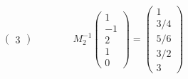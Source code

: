 \documentclass[twoside]{article}
\begin{document}
\begin{solucion}
\begin{gather*}
\begin{pmatrix}
3
\end{pmatrix} \qquad \qquad M_2^{-1}  \begin{pmatrix}
1\\
-1\\
2\\
1\\
0
\end{pmatrix} = 
 \begin{pmatrix}
1\\
3/4\\
5/6\\
3/2\\
3
\end{pmatrix} 
\end{gather*}
\end{solucion}
\end{document}
